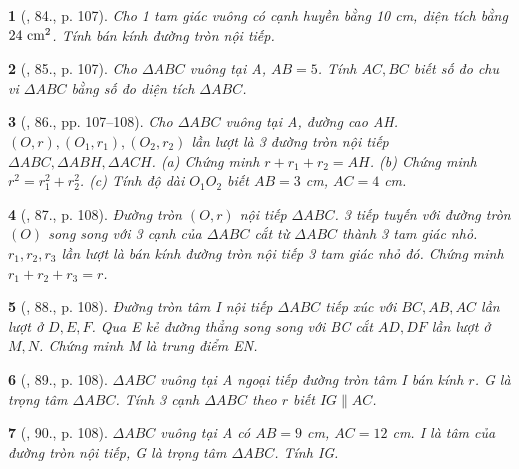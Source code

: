 \documentclass{article}
\newtheorem{baitoan}{}
\begin{document}
\begin{baitoan}[\cite{Binh_Toan_9_tap_1}, 84., p. 107]
	Cho 1 tam giác vuông có cạnh huyền bằng {\rm10 cm}, diện tích bằng $24\ {\rm cm}^2$. Tính bán kính đường tròn nội tiếp.
\end{baitoan}

\begin{baitoan}[\cite{Binh_Toan_9_tap_1}, 85., p. 107]
	Cho $\Delta ABC$ vuông tại A, $AB = 5$. Tính $AC,BC$ biết số đo chu vi $\Delta ABC$ bằng số đo diện tích $\Delta ABC$.
\end{baitoan}

\begin{baitoan}[\cite{Binh_Toan_9_tap_1}, 86., pp. 107--108]
	Cho $\Delta ABC$ vuông tại A, đường cao AH. $(O,r),(O_1,r_1),(O_2,r_2)$ lần lượt là 3 đường tròn nội tiếp $\Delta ABC,\Delta ABH,\Delta ACH$. (a) Chứng minh $r + r_1 + r_2 = AH$. (b) Chứng minh $r^2 = r_1^2 + r_2^2$. (c) Tính độ dài $O_1O_2$ biết $AB = 3$ {\rm cm}, $AC = 4$ {\rm cm}.
\end{baitoan}

\begin{baitoan}[\cite{Binh_Toan_9_tap_1}, 87., p. 108]
	Đường tròn $(O,r)$ nội tiếp $\Delta ABC$. 3 tiếp tuyến với đường tròn $(O)$ song song với 3 cạnh của $\Delta ABC$ cắt từ  $\Delta ABC$ thành 3 tam giác nhỏ. $r_1,r_2,r_3$ lần lượt là bán kính đường tròn nội tiếp 3 tam giác nhỏ đó. Chứng minh $r_1 + r_2 + r_3 = r$. 
\end{baitoan}

\begin{baitoan}[\cite{Binh_Toan_9_tap_1}, 88., p. 108]
	Đường tròn tâm I nội tiếp $\Delta ABC$ tiếp xúc với $BC,AB,AC$ lần lượt ở $D,E,F$. Qua E kẻ đường thẳng song song với BC cắt $AD,DF$ lần lượt ở $M,N$. Chứng minh M là trung điểm EN.
\end{baitoan}

\begin{baitoan}[\cite{Binh_Toan_9_tap_1}, 89., p. 108]
	$\Delta ABC$ vuông tại A ngoại tiếp đường tròn tâm I bán kính $r$. G là trọng tâm $\Delta ABC$. Tính 3 cạnh $\Delta ABC$ theo $r$ biết $IG\parallel AC$.
\end{baitoan}

\begin{baitoan}[\cite{Binh_Toan_9_tap_1}, 90., p. 108]
	$\Delta ABC$ vuông tại A có $AB = 9$ {\rm cm}, $AC = 12$ {\rm cm}. I là tâm của đường tròn nội tiếp, G là trọng tâm $\Delta ABC$. Tính IG.
\end{baitoan}
\end{document}
